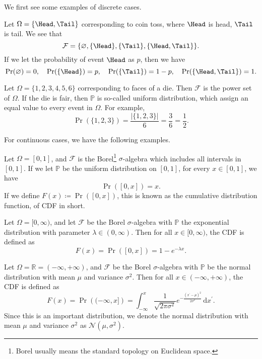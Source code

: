 We first see some examples of discrete cases.
\begin{eg}
	Let \(\Omega = \{\Head, \Tail\}\) corresponding to coin toss, where \(\Head\) is head, \(\Tail\) is tail. We see that
	\[
		\mathcal{F} = \{\varnothing , \{\Head \}, \{\Tail \}, \{\Head , \Tail \}\}.
	\]
	If we let the probability of event \(\Head \) as \(p\), then we have
	\[
		\Pr(\varnothing ) = 0,\quad \Pr(\{\Head\}) = p,\quad \Pr(\{\Tail \}) = 1 - p,\quad \Pr(\{\Head , \Tail \}) = 1.
	\]
\end{eg}

\begin{eg}
	Let \(\Omega = \{1, 2, 3, 4, 5, 6\}\) corresponding to faces of a die. Then \(\mathcal{F} \) is the power set of \(\Omega \). If the die is fair, then \(\mathbb{P} \) is so-called uniform distribution, which assign an equal value to every event in \(\Omega \). For example,
	\[
		\Pr(\{1, 2, 3\}) = \frac{\left\vert \{1, 2, 3\} \right\vert }{6} = \frac{3}{6} = \frac{1}{2}.
	\]
\end{eg}

For continuous cases, we have the following examples.
\begin{eg}
	Let \(\Omega = [0, 1]\), and \(\mathcal{F}\) is the Borel\footnote{Borel usually means the standard topology on Euclidean space.} \(\sigma \)-algebra which includes all intervals in \([0, 1]\). If we let \(\mathbb{P} \) be the uniform distribution on \([0, 1]\), for every \(x\in [0, 1]\), we have
	\[
		\Pr([0, x]) = x.
	\]
	If we define \(F(x)\coloneqq \Pr([0, x]) \), this is known as the cumulative distribution function, of CDF in short.
\end{eg}

\begin{eg}
	Let \(\Omega = [0, \infty )\), and let \(\mathcal{F} \) be the Borel \(\sigma \)-algebra with \(\mathbb{P} \) the exponential distribution with parameter \(\lambda \in (0, \infty )\). Then for all \(x\in [0, \infty )\), the CDF is defined as
	\[
		F(x) = \Pr([0, x]) = 1 - e^{-\lambda x}.
	\]
\end{eg}

\begin{eg}
	Let \(\Omega = \mathbb{R} = (-\infty , +\infty )\), and \(\mathcal{F}\) be the Borel \(\sigma\)-algebra with \(\mathbb{P}\) be the normal distribution with mean \(\mu \) and variance \(\sigma ^{2} \). Then for all \(x\in (-\infty , +\infty )\), the CDF is defined as
	\[
		F(x) = \Pr\left( (-\infty , x] \right)  = \int_{-\infty}^{x} \frac{1}{\sqrt{2\pi \sigma ^{2} } } e^{- \frac{(x^\prime  - \mu )^{2} }{2 \sigma ^{2} }} \,\mathrm{d}x^\prime.
	\]
	Since this is an important distribution, we denote the normal distribution with mean \(\mu\) and variance \(\sigma ^{2} \) as \(\mathcal{N} (\mu , \sigma ^{2} )\).
\end{eg}

